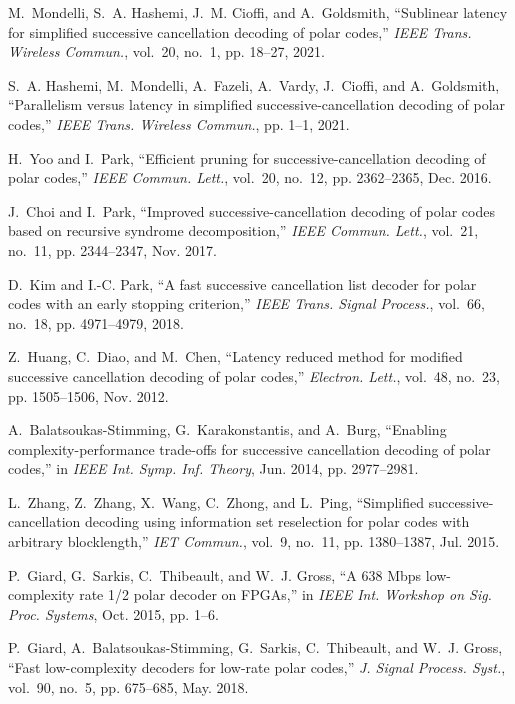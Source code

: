 \documentclass[conference]{IEEEtran}
\begin{document}
\begin{thebibliography}{10}
M.~Mondelli, S.~A. Hashemi, J.~M. Cioffi, and A.~Goldsmith, ``Sublinear latency
  for simplified successive cancellation decoding of polar codes,'' \emph{IEEE
  Trans. Wireless Commun.}, vol.~20, no.~1, pp. 18--27, 2021.

S.~A. Hashemi, M.~Mondelli, A.~Fazeli, A.~Vardy, J.~Cioffi, and A.~Goldsmith,
  ``Parallelism versus latency in simplified successive-cancellation decoding
  of polar codes,'' \emph{IEEE Trans. Wireless Commun.}, pp. 1--1, 2021.

H.~{Yoo} and I.~{Park}, ``Efficient pruning for successive-cancellation
  decoding of polar codes,'' \emph{IEEE Commun. Lett.}, vol.~20, no.~12, pp.
  2362--2365, Dec. 2016.

J.~{Choi} and I.~{Park}, ``Improved successive-cancellation decoding of polar
  codes based on recursive syndrome decomposition,'' \emph{IEEE Commun. Lett.},
  vol.~21, no.~11, pp. 2344--2347, Nov. 2017.

D.~Kim and I.-C. Park, ``A fast successive cancellation list decoder for polar
  codes with an early stopping criterion,'' \emph{IEEE Trans. Signal Process.},
  vol.~66, no.~18, pp. 4971--4979, 2018.

Z.~Huang, C.~Diao, and M.~Chen, ``Latency reduced method for modified
  successive cancellation decoding of polar codes,'' \emph{Electron. Lett.},
  vol.~48, no.~23, pp. 1505--1506, Nov. 2012.

A.~Balatsoukas-Stimming, G.~Karakonstantis, and A.~Burg, ``Enabling
  complexity-performance trade-offs for successive cancellation decoding of
  polar codes,'' in \emph{IEEE Int. Symp. Inf. Theory}, Jun. 2014, pp.
  2977--2981.

L.~Zhang, Z.~Zhang, X.~Wang, C.~Zhong, and L.~Ping, ``Simplified
  successive-cancellation decoding using information set reselection for polar
  codes with arbitrary blocklength,'' \emph{IET Commun.}, vol.~9, no.~11, pp.
  1380--1387, Jul. 2015.

P.~{Giard}, G.~{Sarkis}, C.~{Thibeault}, and W.~J. {Gross}, ``A 638 {Mbps}
  low-complexity rate 1/2 polar decoder on {FPGAs},'' in \emph{IEEE Int.
  Workshop on Sig. Proc. Systems}, Oct. 2015, pp. 1--6.

P.~Giard, A.~Balatsoukas-Stimming, G.~Sarkis, C.~Thibeault, and W.~J. Gross,
  ``Fast low-complexity decoders for low-rate polar codes,'' \emph{J. Signal
  Process. Syst.}, vol.~90, no.~5, pp. 675--685, May. 2018.


\end{thebibliography}
\end{document}
